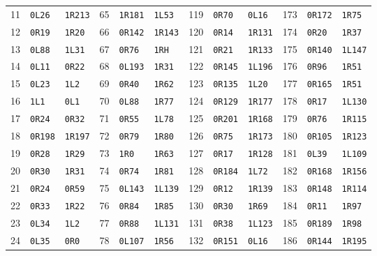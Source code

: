 \begin{longtable}{@{}rll@{\qquad}rll@{\qquad}rll@{\qquad}rll@{}}
11 & \texttt{0L26} & \texttt{1R213} & 65 & \texttt{1R181} & \texttt{1L53} & 119 & \texttt{0R70} & \texttt{0L16} & 173 & \texttt{0R172} & \texttt{1R75}\\
12 & \texttt{0R19} & \texttt{1R20} & 66 & \texttt{0R142} & \texttt{1R143} & 120 & \texttt{0R14} & \texttt{1R131} & 174 & \texttt{0R20} & \texttt{1R37}\\
13 & \texttt{0L88} & \texttt{1L31} & 67 & \texttt{0R76} & \texttt{1RH} & 121 & \texttt{0R21} & \texttt{1R133} & 175 & \texttt{0R140} & \texttt{1L147}\\
14 & \texttt{0L11} & \texttt{0R22} & 68 & \texttt{0L193} & \texttt{1R31} & 122 & \texttt{0R145} & \texttt{1L196} & 176 & \texttt{0R96} & \texttt{1R51}\\
15 & \texttt{0L23} & \texttt{1L2} & 69 & \texttt{0R40} & \texttt{1R62} & 123 & \texttt{0R135} & \texttt{1L20} & 177 & \texttt{0R165} & \texttt{1R51}\\
16 & \texttt{1L1} & \texttt{0L1} & 70 & \texttt{0L88} & \texttt{1R77} & 124 & \texttt{0R129} & \texttt{1R177} & 178 & \texttt{0R17} & \texttt{1L130}\\
17 & \texttt{0R24} & \texttt{0R32} & 71 & \texttt{0R55} & \texttt{1L78} & 125 & \texttt{0R201} & \texttt{1R168} & 179 & \texttt{0R76} & \texttt{1R115}\\
18 & \texttt{0R198} & \texttt{1R197} & 72 & \texttt{0R79} & \texttt{1R80} & 126 & \texttt{0R75} & \texttt{1R173} & 180 & \texttt{0R105} & \texttt{1R123}\\
19 & \texttt{0R28} & \texttt{1R29} & 73 & \texttt{1R0} & \texttt{1R63} & 127 & \texttt{0R17} & \texttt{1R128} & 181 & \texttt{0L39} & \texttt{1L109}\\
20 & \texttt{0R30} & \texttt{1R31} & 74 & \texttt{0R74} & \texttt{1R81} & 128 & \texttt{0R184} & \texttt{1L72} & 182 & \texttt{0R168} & \texttt{1R156}\\
21 & \texttt{0R24} & \texttt{0R59} & 75 & \texttt{0L143} & \texttt{1L139} & 129 & \texttt{0R12} & \texttt{1R139} & 183 & \texttt{0R148} & \texttt{1R114}\\
22 & \texttt{0R33} & \texttt{1R22} & 76 & \texttt{0R84} & \texttt{1R85} & 130 & \texttt{0R30} & \texttt{1R69} & 184 & \texttt{0R11} & \texttt{1R97}\\
23 & \texttt{0L34} & \texttt{1L2} & 77 & \texttt{0R88} & \texttt{1L131} & 131 & \texttt{0R38} & \texttt{1L123} & 185 & \texttt{0R189} & \texttt{1R98}\\
24 & \texttt{0L35} & \texttt{0R0} & 78 & \texttt{0L107} & \texttt{1R56} & 132 & \texttt{0R151} & \texttt{0L16} & 186 & \texttt{0R144} & \texttt{1R195}\\

\end{longtable}
